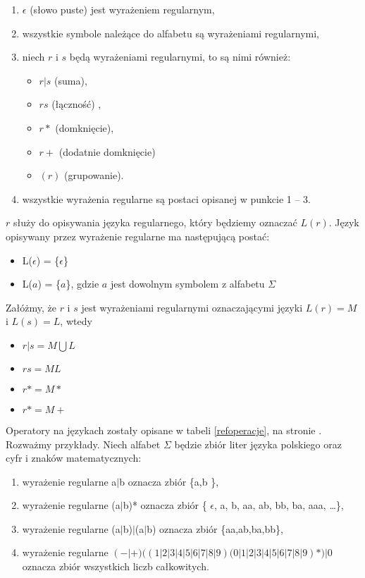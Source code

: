 \begin{enumerate}
 \item    $\epsilon$ (słowo puste) jest wyrażeniem regularnym,
 \item wszystkie symbole należące do alfabetu są wyrażeniami regularnymi,
 \item niech $r$ i $s$ będą wyrażeniami regularnymi, to są nimi również:
      \begin{itemize}
       \item $r|s$  (suma),
       \item $rs$   (łączność) ,
       \item $r*$   (domknięcie),
       \item $r+$   (dodatnie domknięcie)
       \item $(r)$  (grupowanie).
      \end{itemize}
 \item wszystkie wyrażenia regularne są postaci opisanej w punkcie 1 -- 3.      
\end{enumerate}

 $r$ służy do opisywania języka regularnego,
 który będziemy oznaczać $L(r)$.
Język opisywany przez wyrażenie regularne ma następującą postać:
  \begin{itemize}  
   \item L($\epsilon$) = \{$\epsilon$\}
   \item L($a$) = \{$a$\}, gdzie $a$ jest dowolnym symbolem z alfabetu $\Sigma$
  \end{itemize}
Załóżmy, że $r$ i $s$ jest wyrażeniami regularnymi oznaczającymi języki $L(r)=M$ i $L(s)=L$, wtedy
    \begin{itemize}
     \item $r|s = M\bigcup L$
     \item $rs  = ML$
     \item $r*  = M*$
     \item $r*  = M+$
    \end{itemize}
Operatory na językach zostały opisane w tabeli \ref{refoperacje}, na stronie \pageref{refoperacje}. 
Rozważmy przykłady. Niech alfabet $\Sigma$ będzie zbiór liter języka polskiego oraz cyfr i znaków matematycznych:
  \begin{enumerate}
   \item wyrażenie regularne a$|$b oznacza zbiór \{a,b \},
   \item wyrażenie regularne (a$|$b)* oznacza zbiór \{ $\epsilon$, a, b, aa, ab, bb, ba, aaa, \dots \},
   \item wyrażenie regularne (a$|$b)$|$(a$|$b) oznacza zbiór \{aa,ab,ba,bb\}, 
   \item wyrażenie regularne  $ (-|+) ((1|2|3|4|5|6|7|8|9)(0|1|2|3|4|5|6|7|8|9)*)|0  $ oznacza zbiór wszystkich liczb całkowitych. 	
  \end{enumerate}


